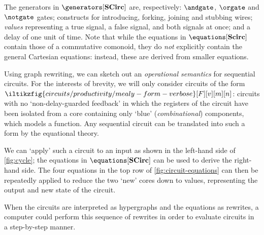 



The generators in \(\generators[\mathbf{SCirc}]\) are, respectively:
\(\andgate\), \(\orgate\) and \(\notgate\) gates; constructs for introducing,
forking, joining and stubbing wires; \emph{values} representing a true signal,
a false signal, and both signals at once; and a delay of one unit of time.
Note that while the equations in \(\equations[\mathbf{Scirc}]\) contain those
of a commutative comonoid, they do \emph{not} explicitly contain the general
Cartesian equations: instead, these are derived from smaller equations.

Using graph rewriting, we can sketch out an \emph{operational semantics} for
sequential circuits.
For the interests of brevity, we will only consider circuits of the form \(
    \iltikzfig{circuits/productivity/mealy-form-verbose}[F][v][m][n]
\): circuits with no `non-delay-guarded feedback' in which the registers of the
circuit have been isolated from a core containing only `blue'
(\emph{combinational}) components, which models a function.
Any sequential circuit can be translated into such a form by the equational
theory.

We can `apply' such a circuit to an input as shown in the left-hand side of
\cref{fig:cycle}; the equations in
\(\equations[\mathbf{SCirc}]\) can be used to derive the right-hand side.
The four equations in the top row of \cref{fig:circuit-equations} can then be
repeatedly applied to reduce the two `new' cores down to values, representing
the output and new state of the circuit.

When the circuits are interpreted as hypergraphs and the equations as rewrites,
a computer could perform this sequence of rewrites in order to evaluate circuits
in a step-by-step manner.
